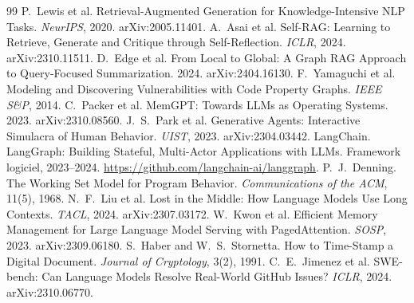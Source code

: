 \documentclass[11pt]{article}
\begin{document}
\begin{thebibliography}{99}
 P.~Lewis et al. Retrieval-Augmented Generation for
Knowledge-Intensive NLP Tasks. \emph{NeurIPS}, 2020. arXiv:2005.11401.
 A.~Asai et al. Self-RAG: Learning to Retrieve, Generate
and Critique through Self-Reflection. \emph{ICLR}, 2024. arXiv:2310.11511.
 D.~Edge et al. From Local to Global: A Graph RAG
Approach to Query-Focused Summarization. 2024. arXiv:2404.16130.
 F.~Yamaguchi et al. Modeling and Discovering
Vulnerabilities with Code Property Graphs. \emph{IEEE S\&P}, 2014.
 C.~Packer et al. MemGPT: Towards LLMs as Operating
Systems. 2023. arXiv:2310.08560.
 J.~S.~Park et al. Generative Agents: Interactive
Simulacra of Human Behavior. \emph{UIST}, 2023. arXiv:2304.03442.
 LangChain. LangGraph: Building Stateful, Multi-Actor
Applications with LLMs. Framework logiciel, 2023--2024.
\url{https://github.com/langchain-ai/langgraph}.
 P.~J.~Denning. The Working Set Model for Program
Behavior. \emph{Communications of the ACM}, 11(5), 1968.
 N.~F.~Liu et al. Lost in the Middle: How Language Models Use
Long Contexts. \emph{TACL}, 2024. arXiv:2307.03172.
 W.~Kwon et al. Efficient Memory Management for Large
Language Model Serving with PagedAttention. \emph{SOSP}, 2023. arXiv:2309.06180.
 S.~Haber and W.~S.~Stornetta. How to Time-Stamp a
Digital Document. \emph{Journal of Cryptology}, 3(2), 1991.
 C.~E.~Jimenez et al. SWE-bench: Can Language Models
Resolve Real-World GitHub Issues? \emph{ICLR}, 2024. arXiv:2310.06770.
\end{thebibliography}
\end{document}
